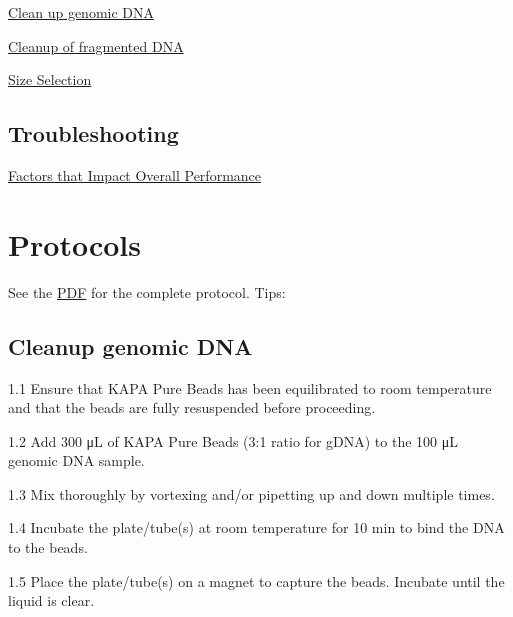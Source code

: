 \documentclass[
  letterpaper,
  DIV=11,
  numbers=noendperiod]{scrreprt}
\begin{document}
\href{https://drk-lo.github.io/lotterhoslabprotocols/molecprot_magbeadwash/\#clean-up-genomic-dna}{Clean
up genomic DNA}

\href{https://drk-lo.github.io/lotterhoslabprotocols/molecprot_magbeadwash/\#cleanup-of-fragmented-dna}{Cleanup
of fragmented DNA}

\href{https://drk-lo.github.io/lotterhoslabprotocols/molecprot_magbeadwash/\#size-selection}{Size
Selection}

\hypertarget{troubleshooting}{%
\subsection*{\texorpdfstring{\textbf{Troubleshooting}}{Troubleshooting}}\label{troubleshooting}}

\href{https://drk-lo.github.io/lotterhoslabprotocols/molecprot_magbeadwash/\#factors-that-impact-overall-performance}{Factors
that Impact Overall Performance}

\hypertarget{protocols-1}{%
\section*{\texorpdfstring{\textbf{Protocols}}{Protocols}}\label{protocols-1}}

See the
\href{https://www.kapabiosystems.com/document/kapa-pure-beads-tds/?dl=1}{PDF}
for the complete protocol. Tips:

\hypertarget{cleanup-genomic-dna}{%
\subsection*{\texorpdfstring{\textbf{Cleanup genomic
DNA}}{Cleanup genomic DNA}}\label{cleanup-genomic-dna}}

1.1 Ensure that KAPA Pure Beads has been equilibrated to room
temperature and that the beads are fully resuspended before proceeding.

1.2 Add 300 μL of KAPA Pure Beads (3:1 ratio for gDNA) to the 100 μL
genomic DNA sample.

1.3 Mix thoroughly by vortexing and/or pipetting up and down multiple
times.

1.4 Incubate the plate/tube(s) at room temperature for 10 min to bind
the DNA to the beads.

1.5 Place the plate/tube(s) on a magnet to capture the beads. Incubate
until the liquid is clear.
\end{document}
